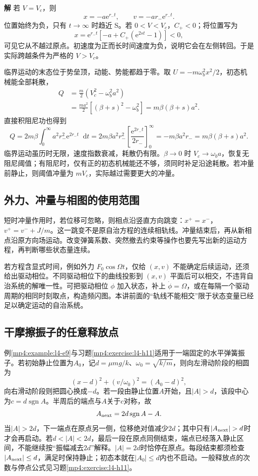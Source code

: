 \documentclass[11pt,openany,fontset=fandol]{ctexbook}
\theoremstyle{definition}\newtheorem{example}{例}[chapter]\newtheorem{exercise}{习题}[chapter]
\newcommand{\SolutionStart}{\par\medskip\ifdim\pagetotal>0pt\ifdim\dimexpr\pagegoal-\pagetotal\relax<3\baselineskip\newpage\fi\fi\noindent\textbf{解}\quad\ignorespaces}
\newenvironment{solution}{\SolutionStart}{\par\medskip}
\newcommand{\dd}{\mathop{}\!\mathrm d}\newcommand{\ee}{\mathrm e}\newcommand{\vct}[1]{\bm{#1}}
\begin{document}
\begin{solution}
若 $V=V_c$，则
\[
x=-a\ee^{r_-t},\qquad v=-ar_-\ee^{r_-t}.
\]
位置始终为负，只有 $t\to\infty$ 时趋近 S。若 $0<V<V_c$，$C_+<0$；将位置写为
\[
x=\ee^{r_-t}\left[-a+C_+(\ee^{2st}-1)\right]<0,
\]
可见它从不越过原点。初速度为正而长时间速度为负，说明它会在左侧转回。于是实际跨越条件为严格的 $V>V_c$。

临界运动的末态位于势垒顶，动能、势能都趋于零。取 $U=-m\omega_b^2x^2/2$，初态机械能全部耗散，
\begin{align*}
Q&=\frac m2(V_c^2-\omega_b^2a^2)\\
&=\frac{ma^2}{2}\left[(\beta+s)^2-\omega_b^2\right]
=m\beta(\beta+s)a^2.
\end{align*}
直接积阻尼功也得到
\[
Q=2m\beta\int_0^\infty a^2r_-^2\ee^{2r_-t}\dd t
=2m\beta a^2r_-^2\left[\frac{\ee^{2r_-t}}{2r_-}\right]_0^\infty
=-m\beta a^2r_-=m\beta(\beta+s)a^2.
\]
临界运动虽历时无限，速度指数衰减，耗散仍有限。$\beta\to0$ 时 $V_c\to\omega_ba$，恢复无阻尼阈值；有阻尼时，仅有正的初态机械能还不够，须同时补足沿途耗散。若冲量前静止，则阈值冲量为 $mV_c$，实际越过需要更大的冲量。
\end{solution}

\subsection{外力、冲量与相图的使用范围}
短时冲量作用时，若位移可忽略，则相点沿竖直方向跳变：$x^+=x^-$，$v^+=v^-+J/m$。这一跳变不是原自治方程的连续相轨线。冲量结束后，再从新相点沿原方向场运动。改变弹簧系数、突然撤去约束等操作也要先写出新的运动方程，再判断哪些状态量连续。

若方程含显式时间，例如外力 $F_0\cos\Omega t$，仅给 $(x,v)$ 不能确定后续运动，还须给出驱动相位。不同驱动相位下的曲线投影到 $(x,v)$ 平面后可以相交，不违背自治系统的解唯一性。可把驱动相位 $\phi$ 加入状态，补上 $\dot\phi=\Omega$，或在每隔一个驱动周期的相同时刻取点，构造频闪图。本讲前面的“轨线不能相交”限于状态变量已经足以确定运动的自治系统。


\subsection{干摩擦振子的任意释放点}
例\ref{mp4:example:l4-e9}与习题\ref{mp4:exercise:l4-h11}适用于一端固定的水平弹簧振子。若初始静止位置为$A_0$，记$d=\mu mg/k$、$\omega_0=\sqrt{k/m}$，则向左滑动阶段的相圆为
\[
 (x-d)^2+(v/\omega_0)^2=(A_0-d)^2,
\]
向右滑动阶段则把圆心换成$-d$。若一段由静止位置$A$开始，且$|A|>d$，该段中心为$c=d\operatorname{sgn}A$。半周后的端点与$A$关于$c$对称，故
\[
A_{\rm next}=2d\operatorname{sgn}A-A.
\]
当$|A|>2d$，下一端点在原点另一侧，位移绝对值减少$2d$；其中只有$|A_{\rm next}|>d$时才会再启动。若$d<|A|<2d$，最后一段在原点同侧结束，端点已经落入静止区间，不能继续按“振幅减去$2d$”解释。$|A|=2d$时恰停在原点。每段结束都须检查$|A_{\rm next}|\le d$，满足时保持静止；初态本就在$|A_0|\le d$内也不启动。一般释放点的次数与停点公式见习题\ref{mp4:exercise:l4-h11}。
\end{document}
